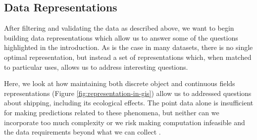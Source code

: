 


\subsection{Data Representations}


After filtering and validating the data as described above, we want to begin building data representations which allow us to answer some of the questions highlighted in the introduction. As is the case in many datasets, there is no single optimal representation, but instead a set of representations which, when matched to particular uses, allows us to address interesting questions.

Here, we look at how maintaining both discrete object and continuous fields representations (Figure \ref{fig:representation-in-gis}) allow us to addressed questions about shipping, including its ecological effects. The point data alone is insufficient for making predictions related to these phenomena, but neither can we incorporate too much complexity or we risk making computation infeasible and the data requirements beyond what we can collect \citep{de2007geospatial}.


